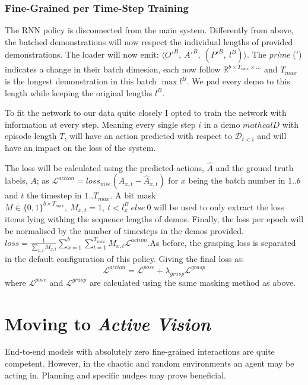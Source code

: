 \subsubsection{Fine-Grained per Time-Step Training}
The RNN policy is disconnected from the main system. Differently from above, the batched demonstrations will now respect the individual lengths of provided demonstrations. The loader will now emit: \( \langle {O'}^B, ~{A'}^B, ~\left( {P'}^B, ~l^B \right) \rangle\). The \emph{prime} ($'$) indicates a change in their batch dimesion, each now follow $\mathbb{R}^{b \times T_{max} \times \ldots}$ and  $T_{max}$ is the longest demonstration in this batch \(\max l^{B}\). We pad every demo to this length while keeping the original lengths $l^{B}$.

To fit the network to our data quite closely I opted to train the network with information at every step. Meaning every single step $i$ in a demo $mathcal{D}$ with episode length $T$, will have an action predicted with respect to $\mathcal{D}_{t < i}$ and will have an impact on the loss of the system. 

The loss will be calculated using the predicted actions, $\hat{A}$ and the ground truth labels, $A$; as \( \mathcal{L}^{action} = {loss}_{mse}\left(A_{x, t} - \hat{A}_{x, t}\right)\) for $x$ being the batch number in $1..b$ and $t$ the timestep in $1..T_{max}$. A bit mask \(M \in \{0, 1\}^{b \times T_{max}}, ~M_{x, t} = 1, ~t < l^B_x ~else ~0\) will be used to only extract the loss items lying withing the sequence lengths of demos. Finally, the loss per epoch will be normalised by the number of timesteps in the demos provided. \(loss = \frac{1}{\sum_{x, t}M_{x, t}}{\sum_{x = 1}^{b}\sum_{t = 1}^{T_{max}}M_{x, t} \mathcal{L}^{action}}\).As before, the grasping loss is separated in the default configuration of this policy. Giving the final loss as: 
\[
  \mathcal{L}^{action} = \mathcal{L}^{pose} + \lambda_{grasp} \mathcal{L}^{grasp}
\]
where $\mathcal{L}^{pose}$ and $\mathcal{L}^{grasp}$ are calculated using the same masking method as above.

\section{Moving to \emph{Active Vision}}
End-to-end models with absolutely zero fine-grained interactions are quite competent. However, in the chaotic and random environments an agent may be acting in. Planning and specific nudges may prove beneficial. 